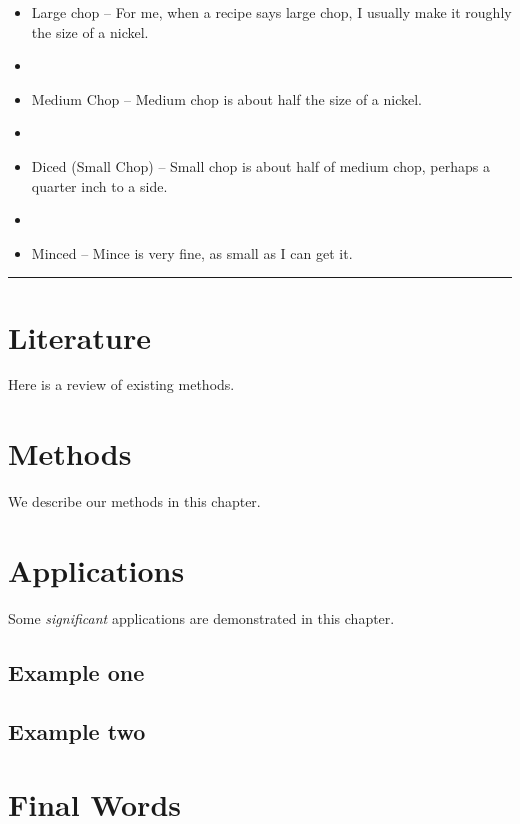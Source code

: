 \documentclass[
]{book}
\begin{document}
\begin{itemize}
\item
  Large chop -- For me, when a recipe says large chop, I usually make it roughly the size of a nickel.
\item
\item
  Medium Chop -- Medium chop is about half the size of a nickel.
\item
\item
  Diced (Small Chop) -- Small chop is about half of medium chop, perhaps a quarter inch to a side.
\item
\item
  Minced -- Mince is very fine, as small as I can get it.
\end{itemize}

\begin{center}\rule{0.5\linewidth}{0.5pt}\end{center}

\hypertarget{literature}{%
\chapter{Literature}\label{literature}}

Here is a review of existing methods.

\hypertarget{methods}{%
\chapter{Methods}\label{methods}}

We describe our methods in this chapter.

\hypertarget{applications}{%
\chapter{Applications}\label{applications}}

Some \emph{significant} applications are demonstrated in this chapter.

\hypertarget{example-one}{%
\section{Example one}\label{example-one}}

\hypertarget{example-two}{%
\section{Example two}\label{example-two}}

\hypertarget{final-words}{%
\chapter{Final Words}\label{final-words}}
\end{document}
